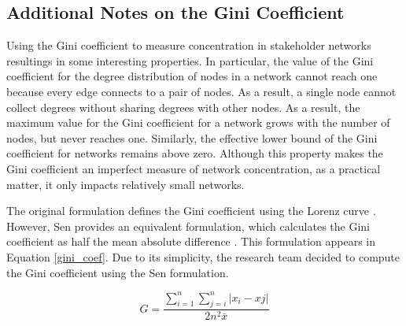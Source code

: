 \subsection*{Additional Notes on the Gini Coefficient}

Using the Gini coefficient to measure concentration in stakeholder networks resultings in some interesting properties. In particular, the value of the Gini coefficient \cite{gini, gini2} for the degree distribution of nodes in a network cannot reach one because every edge connects to a pair of nodes. As a result, a single node cannot collect degrees without sharing degrees with other nodes. As a result, the maximum value for the Gini coefficient for a network grows with the number of nodes, but never reaches one. Similarly, the effective lower bound of the Gini coefficient for networks remains above zero. Although this property makes the Gini coefficient an imperfect measure of network concentration, as a practical matter, it only impacts relatively small networks.

The original formulation defines the Gini coefficient using the Lorenz curve \cite{gini}. However, Sen provides an equivalent formulation, which calculates the Gini coefficient as half the mean absolute difference \cite{sen}. This formulation appears in Equation \ref{gini_coef}. Due to its simplicity, the research team decided to compute the Gini coefficient using the Sen formulation.

\begin{equation}
\label{gini_coef}
    G = \frac{\sum_{i=1}^{n} \sum_{j=i}^{n} | x_{i} - x{j} |}{2n^2 \bar{x}}
\end{equation}

